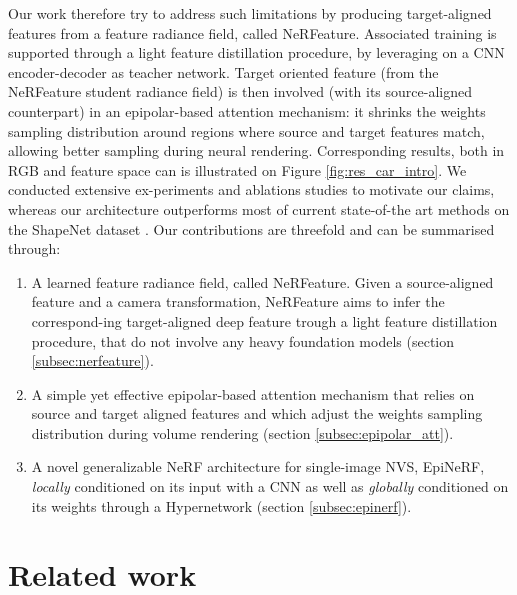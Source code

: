 Our work therefore try to address such limitations by producing target-aligned features from a feature radiance field, called NeRFeature. Associated training is supported through a light feature distillation procedure, by leveraging on a CNN encoder-decoder as teacher network. Target oriented feature (from the NeRFeature student radiance field) is then involved (with its source-aligned counterpart) in an epipolar-based attention mechanism: it shrinks the weights sampling distribution around regions where source and target features match, allowing better sampling during neural rendering. Corresponding results, both in RGB and feature space can is illustrated on Figure \ref{fig:res_car_intro}. We conducted extensive ex\--periments and ablations studies to motivate our claims, whereas our architecture outperforms most of current state-of-the art methods on the ShapeNet dataset \citep{chang2015shapenet}. Our contributions are threefold and can be summarised through: 
\begin{enumerate}
   \item A learned feature radiance field, called NeRFeature. Given a source-aligned feature and a camera transformation, NeRFeature aims to infer the correspond\--ing target-aligned deep feature trough a light feature distillation procedure, that do not involve any heavy foundation models (section \ref{subsec:nerfeature}). 
    \item A simple yet effective epipolar-based attention mechanism that relies on source and target aligned features and which adjust the weights sampling distribution during volume rendering (section \ref{subsec:epipolar_att}). 
    \item A novel generalizable NeRF architecture for single-image NVS, EpiNeRF, \textit{locally} conditioned on its input with a CNN as well as \textit{globally} conditioned on its weights through a Hypernetwork (section \ref{subsec:epinerf}).  
\end{enumerate}

\section{Related work}

